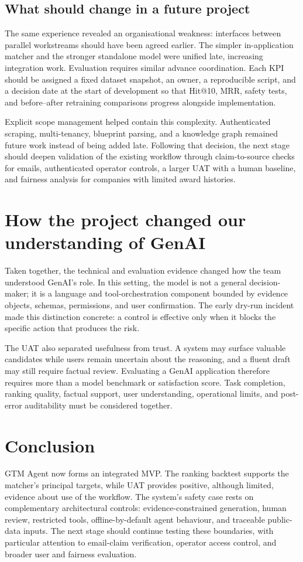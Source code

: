 \documentclass[10pt,a4paper]{article}
\begin{document}
\subsection{What should change in a future project}
The same experience revealed an organisational weakness: interfaces between parallel workstreams should have been agreed earlier. The simpler in-application matcher and the stronger standalone model were unified late, increasing integration work. Evaluation requires similar advance coordination. Each KPI should be assigned a fixed dataset snapshot, an owner, a reproducible script, and a decision date at the start of development so that Hit@10, MRR, safety tests, and before--after retraining comparisons progress alongside implementation.

Explicit scope management helped contain this complexity. Authenticated scraping, multi-tenancy, blueprint parsing, and a knowledge graph remained future work instead of being added late. Following that decision, the next stage should deepen validation of the existing workflow through claim-to-source checks for emails, authenticated operator controls, a larger UAT with a human baseline, and fairness analysis for companies with limited award histories.

\section{How the project changed our understanding of GenAI}

Taken together, the technical and evaluation evidence changed how the team understood GenAI's role. In this setting, the model is not a general decision-maker; it is a language and tool-orchestration component bounded by evidence objects, schemas, permissions, and user confirmation. The early dry-run incident made this distinction concrete: a control is effective only when it blocks the specific action that produces the risk.

The UAT also separated usefulness from trust. A system may surface valuable candidates while users remain uncertain about the reasoning, and a fluent draft may still require factual review. Evaluating a GenAI application therefore requires more than a model benchmark or satisfaction score. Task completion, ranking quality, factual support, user understanding, operational limits, and post-error auditability must be considered together.

\section{Conclusion}

GTM Agent now forms an integrated MVP. The ranking backtest supports the matcher's principal targets, while UAT provides positive, although limited, evidence about use of the workflow. The system's safety case rests on complementary architectural controls: evidence-constrained generation, human review, restricted tools, offline-by-default agent behaviour, and traceable public-data inputs. The next stage should continue testing these boundaries, with particular attention to email-claim verification, operator access control, and broader user and fairness evaluation.
\end{document}
